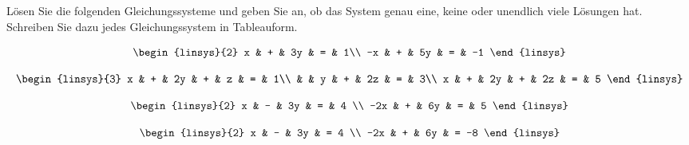 Lösen Sie die folgenden Gleichungssysteme und geben Sie an,
ob das System genau eine, keine oder unendlich viele Lösungen
hat. Schreiben Sie dazu jedes Gleichungssystem in Tableauform.
\begin{teilaufgaben}
\item
\[
\begin{linsys}{2}
 x & + & 3y & = &  1\\
-x & + & 5y & = & -1
\end{linsys}
\]
\item
\[
\begin{linsys}{3}
x & + & 2y & + &  z & = & 1\\
  &   &  y & + & 2z & = & 3\\
x & + & 2y & + & 2z & = & 5 
\end{linsys}
\]
\item
\[
\begin{linsys}{2}
  x & - & 3y & = & 4 \\
-2x & + & 6y & = & 5
\end{linsys}
\]
\item
\[
\begin{linsys}{2}
  x & - & 3y & =  4 \\
-2x & + & 6y & = -8
\end{linsys}
\]
\end{teilaufgaben}

